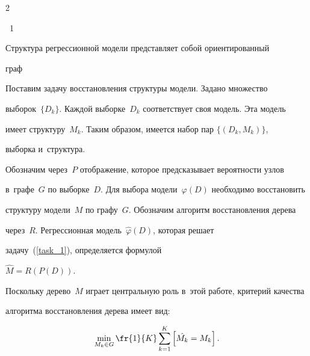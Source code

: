 \begin{multicols}{2}
{\noindent

{{\figurename~1}\ \ \small{Структура регрессионной модели представляет собой ориентированный 

граф

}}}






\addtocounter{figure}{1}











Поставим задачу восстановления структуры модели. Задано множество 

выборок~$\{D_k\}$. Каждой выборке~$D_k$ соответствует своя модель. Эта модель 

имеет структуру~$M_k$. Таким образом, имеется набор пар $\{(D_k, M_k)\}$, 

выборка и~структура.

Обозначим через~$P$ отображение, которое предсказывает вероятности узлов 

в~графе~$G$ по выборке~$D$. Для выбора модели~$\varphi(D)$ необходимо восстановить 

структуру модели~$M$ по графу~$G$. Обозначим алгоритм восстановления дерева 

через~$R$. Регрессионная модель~$\hat{\varphi}(D)$, которая решает 

задачу~(\ref{task_1}), определяется формулой

$

\hat{M}=R\left(P(D)\right).

$

Поскольку дерево~$M$ играет центральную роль в~этой работе, критерий качества 

алгоритма восстановления дерева имеет вид:





\vspace*{-2pt}



\noindent

$$

\min_{M_k \in G} \fr{1}{K}\sum\limits_{k=1}^K \left[ \hat{M_k} = M_k\right].

$$



\vspace*{-2pt}




\end{multicols}
